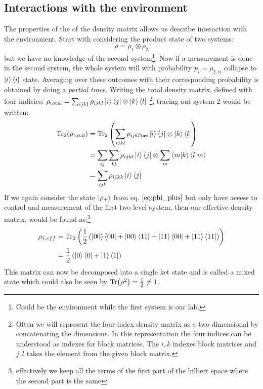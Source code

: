 \subsection{Interactions with the environment}
The properties of the of the density matrix allows us describe interaction with the environment. Start with considering the product state of two systems:
\begin{equation}
    \rho = \rho_1 \otimes \rho_2
\end{equation}
but we have no knowledge of the second system\footnote{Could be the environment while the first system is our lab.}. Now if a measurement is done in the second system, the whole system will with probability $p_i = \rho_{2, ii}$ collapse to $\ket{i}\bra{i}$ state. Averaging over these outcomes with their corresponding probability is obtained by doing a \textit{partial trace}. Writing the total density matrix, defined with four indicies: $\rho_{\text{total}} = \sum_{ijkl}\rho_{ijkl}\ket{i}\bra{j}\otimes\ket{k}\bra{l}$ \footnote{Often we will represent the four-index density matrix as a two dimensional by concatenating the dimensions. In this representation the four indices can be understood as indexes for block matrices. The $i, k$ indexes block matrices and $j, l$ takes the element from the given block matrix.}, tracing out system 2 would be written:
\begin{align}
    \Tr_2 (\rho_{\text{total}})   &= \Tr_2 \left(\sum_{ijkl} \rho_{ijklæ} \ket{i}\bra{j} \otimes \ket{k}\bra{l}\right) \nonumber \\
                                    &= \sum_{ij}\sum_{kl} \rho_{ijkl} \ket{i}\bra{j} \otimes \sum_m \bra{m}  \ket{k}\bra{l}\ket{m} \nonumber \\
    &= \sum_{ijk} \rho_{ijkk} \ket{i}\bra{j}
\end{align}
If we again consider the state $\ket{\rho_+}$ from eq. $\ref{eq:phi_plus}$ but only have access to control and measurement of the first two level system, then our effective density matrix, would be found as:\footnote{effectively we keep all the terms of the first part of the hilbert space where the second part is the same}
\begin{align}
    \rho_{1, eff}   &= \Tr_2 \left(\frac12 \left(\ket{00}\bra{00} + \ket{00}\bra{11} + \ket{11}\bra{00} + \ket{11}\bra{11} \right) \right) \\
                    &= \frac12 \left(\ket{0}\bra{0} + \ket{1}\bra{1} \right)
\end{align}
This matrix can now be decomposed into a single ket state and is called a mixed state which could also be seen by $\Tr(\rho^2) = \frac12\neq1$. 

